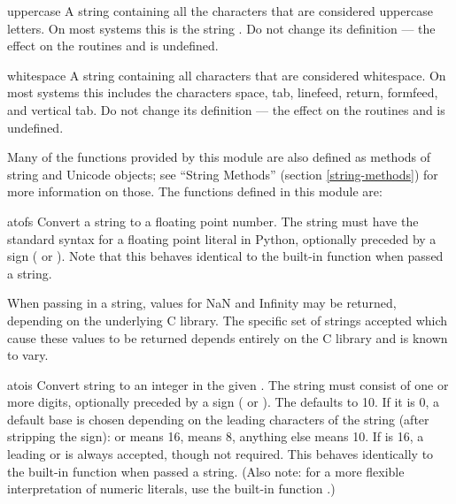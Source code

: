 \begin{datadesc}{uppercase}
  A string containing all the characters that are considered uppercase
  letters.  On most systems this is the string
  .  Do not change its definition ---
  the effect on the routines  and
   is undefined.
\end{datadesc}

\begin{datadesc}{whitespace}
  A string containing all characters that are considered whitespace.
  On most systems this includes the characters space, tab, linefeed,
  return, formfeed, and vertical tab.  Do not change its definition ---
  the effect on the routines  and 
  is undefined.
\end{datadesc}


Many of the functions provided by this module are also defined as
methods of string and Unicode objects; see ``String Methods'' (section
\ref{string-methods}) for more information on those.
The functions defined in this module are:

\begin{funcdesc}{atof}{s}
  Convert a string to a floating point number.  The string must have
  the standard syntax for a floating point literal in Python,
  optionally preceded by a sign (\samp{+} or \samp{-}).  Note that
  this behaves identical to the built-in function
   when passed a string.

   When passing in a string, values for NaN
  and Infinity may be returned, depending on the
  underlying C library.  The specific set of strings accepted which
  cause these values to be returned depends entirely on the C library
  and is known to vary.
\end{funcdesc}

\begin{funcdesc}{atoi}{s}
  Convert string  to an integer in the given .  The
  string must consist of one or more digits, optionally preceded by a
  sign (\samp{+} or \samp{-}).  The  defaults to 10.  If it
  is 0, a default base is chosen depending on the leading characters
  of the string (after stripping the sign):  or 
  means 16,  means 8, anything else means 10.  If 
  is 16, a leading  or  is always accepted, though
  not required.  This behaves identically to the built-in function
   when passed a string.  (Also note: for a more
  flexible interpretation of numeric literals, use the built-in
  function .)
\end{funcdesc}

